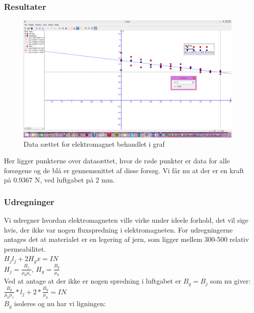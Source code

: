 \subsubsection*{Resultater}
\begin{figure}[h!]
\center
\includegraphics[scale=0.3]{./Graphics/Graf_Elektromagnet_resultater}
\caption{Data sættet for elektromagnet behandlet i graf}
\label{Elektromagnet}
\end{figure}

Her ligger punkterne over datasættet, hvor de røde punkter er data for alle forsøgene og de blå er gennemsnittet af disse forsøg. Vi får nu at der er en kraft på 0.9367 N, ved luftgabet på 2 mm.

\subsubsection*{Udregninger}
Vi udregner hvordan elektromagneten ville virke under ideele forhold, det vil sige hvis, der ikke var nogen fluxspredning i elektromagneten. For udregningerne antages det at materialet er en legering af jern, som ligger mellem 300-500 relativ permeabilitet.\\

$H_{j}l_{j}+2H_{g}x=IN$ \\

$H_{j}=\frac{B_{j}}{\mu_{0}\mu_{r}},\,H_{g}=\frac{B_{g}
}{\mu_{0}}$\\

Ved at antage at der ikke er nogen spredning i luftgabet er $B_{g}=B_{j}$ som nu giver:\\

$\frac{B_{g}}{\mu_{0}\mu_{r}}*l_{j}+2*\frac{B_{g}}{\mu_{0}}=IN$\\

$B_{g}$ isoleres og nu har vi ligningen:\\

